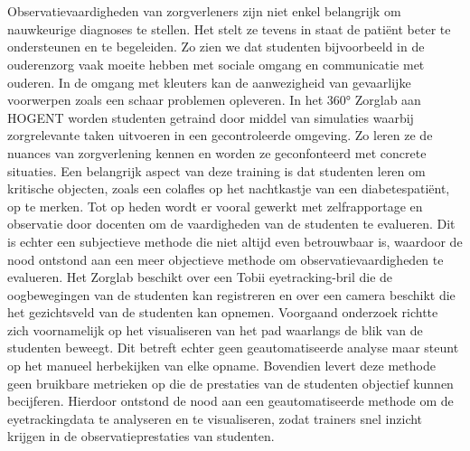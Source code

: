
\chapter{}%
\label{ch:inleiding}

Observatievaardigheden van zorgverleners zijn niet enkel belangrijk om nauwkeurige diagnoses te stellen. Het stelt ze tevens in staat de patiënt beter te ondersteunen en te begeleiden. 
Zo zien we dat studenten bijvoorbeeld in de ouderenzorg vaak moeite hebben met sociale omgang en communicatie met ouderen. 
In de omgang met kleuters kan de aanwezigheid van gevaarlijke voorwerpen zoals een schaar problemen opleveren.
In het 360° Zorglab aan HOGENT worden studenten getraind door middel van simulaties waarbij zorgrelevante taken uitvoeren in een gecontroleerde omgeving.
Zo leren ze de nuances van zorgverlening kennen en worden ze geconfonteerd met concrete situaties. 
Een belangrijk aspect van deze training is dat studenten leren om kritische objecten, zoals een colafles op het nachtkastje van een diabetespatiënt, op te merken.
Tot op heden wordt er vooral gewerkt met zelfrapportage en observatie door docenten om de vaardigheden van de studenten te evalueren.
Dit is echter een subjectieve methode die niet altijd even betrouwbaar is, waardoor de nood ontstond aan een meer objectieve methode om observatievaardigheden te evalueren.
Het Zorglab beschikt over een Tobii eyetracking-bril die de oogbewegingen van de studenten kan registreren en over een camera beschikt die het gezichtsveld van de studenten kan opnemen.
Voorgaand onderzoek richtte zich voornamelijk op het visualiseren van het pad waarlangs de blik van de studenten beweegt. 
Dit betreft echter geen geautomatiseerde analyse maar steunt op het manueel herbekijken van elke opname.
Bovendien levert deze methode geen bruikbare metrieken op die de prestaties van de studenten objectief kunnen becijferen.
Hierdoor ontstond de nood aan een geautomatiseerde methode om de eyetrackingdata te analyseren en te visualiseren, zodat trainers snel inzicht krijgen in de observatieprestaties van studenten.

\section{}%
\label{sec:probleemstelling}

